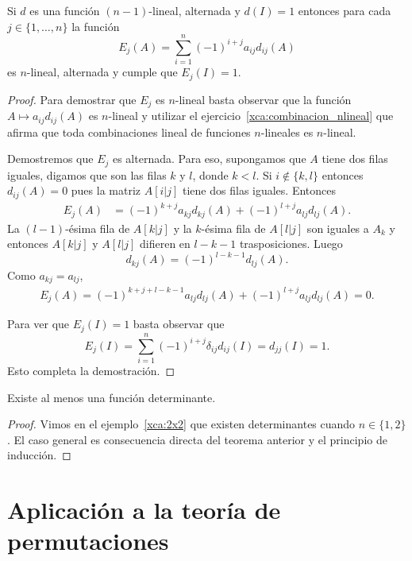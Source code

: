 \begin{thm}
    \label{thm:desarrollo_cols}
    Si $d$ es una función $(n-1)$-lineal, alternada y $d(I)=1$ entonces para
    cada $j\in\{1,\dots,n\}$ la función
    \[
        E_j(A)=\sum_{i=1}^n(-1)^{i+j}a_{ij}d_{ij}(A)
    \]
    es $n$-lineal, alternada y cumple que $E_j(I)=1$.

    \begin{proof}
		Para demostrar que $E_j$ es $n$-lineal basta observar que la función
		$A\mapsto a_{ij}d_{ij}(A)$ es $n$-lineal y utilizar el
		ejercicio~\ref{xca:combinacion_nlineal} que afirma que toda
		combinaciones lineal de funciones $n$-lineales es $n$-lineal.

		Demostremos que $E_j$ es alternada. Para eso, supongamos que $A$ tiene
		dos filas iguales, digamos que son las filas $k$ y $l$, donde $k<l$. Si
		$i\not\in\{k,l\}$ entonces $d_{ij}(A)=0$ pues la matriz $A[i|j]$ tiene
		dos filas iguales. Entonces
		\begin{align*}
			E_j(A)&=(-1)^{k+j}a_{kj}d_{kj}(A)+(-1)^{l+j}a_{lj}d_{lj}(A).
		\end{align*}
		La $(l-1)$-ésima fila de $A[k|j]$ y la $k$-ésima fila de $A[l|j]$ son
		iguales a $A_k$ y entonces $A[k|j]$ y $A[l|j]$ difieren en $l-k-1$
		trasposiciones. Luego 
		\[
			d_{kj}(A)=(-1)^{l-k-1}d_{lj}(A).
		\]
		Como $a_{kj}=a_{lj}$, 
		\begin{align*}
			E_j(A)
			=(-1)^{k+j+l-k-1}a_{lj}d_{lj}(A)+(-1)^{l+j}a_{lj}d_{lj}(A)
			=0.
		\end{align*}
		
		Para ver que $E_j(I)=1$ basta observar que 
        \[
            E_j(I)=\sum_{i=1}^n(-1)^{i+j}\delta_{ij}d_{ij}(I)=d_{jj}(I)=1.
        \]
        Esto completa la demostración.
    \end{proof}
\end{thm}

\begin{cor}
    \label{cor:determinante:existencia}
    Existe al menos una función determinante. 

    \begin{proof}
		Vimos en el ejemplo~\ref{xca:2x2} que existen determinantes cuando
		$n\in\{1,2\}$. El caso general es consecuencia directa del teorema
		anterior y el principio de inducción.
    \end{proof}
\end{cor}

\section{Aplicación a la teoría de permutaciones}

